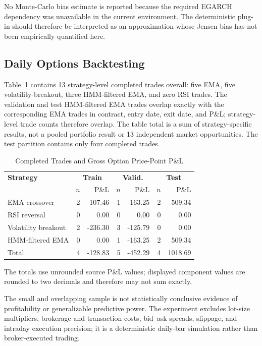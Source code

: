 \documentclass[journal]{IEEEtran}
\begin{document}
No Monte-Carlo bias estimate is reported because the required EGARCH
dependency was unavailable in the current environment. The deterministic
plug-in should therefore be interpreted as an approximation whose Jensen bias
has not been empirically quantified here.

\subsection{Daily Options Backtesting}

Table~\ref{tab:backtest_trades} contains 13 strategy-level completed trades overall: five EMA, five volatility-breakout, three HMM-filtered EMA, and zero RSI trades. The validation and test HMM-filtered EMA trades overlap exactly with the corresponding EMA trades in contract, entry date, exit date, and P\&L; strategy-level trade counts therefore overlap. The table total is a sum of strategy-specific results, not a pooled portfolio result or 13 independent market opportunities. The test partition contains only four completed trades.

\begin{table}[!t]
\renewcommand{\arraystretch}{1.2}
\caption{Completed Trades and Gross Option Price-Point P\&L}
\label{tab:backtest_trades}
\centering
\begin{tabular}{lrrrrrr}
\toprule
\textbf{Strategy} & \multicolumn{2}{c}{\textbf{Train}} & \multicolumn{2}{c}{\textbf{Valid.}} & \multicolumn{2}{c}{\textbf{Test}} \\
& $n$ & P\&L & $n$ & P\&L & $n$ & P\&L \\
\midrule
EMA crossover        & 2 & 107.46  & 1 & -163.25 & 2 & 509.34 \\
RSI reversal         & 0 & 0.00    & 0 & 0.00    & 0 & 0.00 \\
Volatility breakout  & 2 & -236.30 & 3 & -125.79 & 0 & 0.00 \\
HMM-filtered EMA     & 0 & 0.00    & 1 & -163.25 & 2 & 509.34 \\
\midrule
Total                & 4 & -128.83 & 5 & -452.29 & 4 & 1018.69 \\
\bottomrule
\end{tabular}
\end{table}
The totals use unrounded source P\&L values; displayed component values are rounded to two decimals and therefore may not sum exactly.

The small and overlapping sample is not statistically conclusive evidence of profitability or generalizable predictive power. The experiment excludes lot-size multipliers, brokerage and transaction costs, bid--ask spreads, slippage, and intraday execution precision; it is a deterministic daily-bar simulation rather than broker-executed trading.
\end{document}

